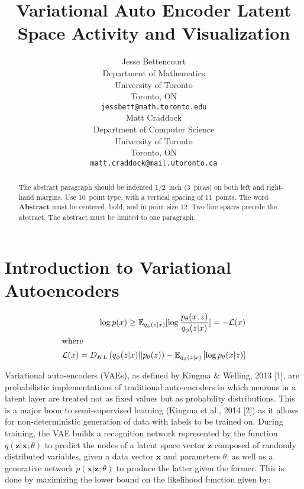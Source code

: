 \documentclass{article} %
\title{Variational Auto Encoder Latent Space Activity and Visualization}
\author{
Jesse Bettencourt\\
Department of Mathematics\\
University of Toronto\\
Toronto, ON \\
\texttt{jessbett@math.toronto.edu} \\
\And
Matt Craddock\\
Department of Computer Science\\
University of Toronto\\
Toronto, ON \\
\texttt{matt.craddock@mail.utoronto.ca} \\
}
\renewcommand{\L}{\mathcal{L}}
\begin{document}
\maketitle

\begin{abstract}
The abstract paragraph should be indented 1/2~inch (3~picas) on both left and
right-hand margins. Use 10~point type, with a vertical spacing of 11~points.
The word \textbf{Abstract} must be centered, bold, and in point size 12. Two
line spaces precede the abstract. The abstract must be limited to one
paragraph.
\end{abstract}

\section{Introduction to Variational Autoencoders}



\begin{align}
\log p(x)\geq \mathbb{E}_{q_\phi(z|x)}[\log\frac{p_\theta(x,z)}{q_\phi(z|x)}]=-\L(x)\\
\intertext{where}
  \L(x)=D_{KL}\left(q_\phi(z|x)||p_\theta(z)\right)-\mathbb{E}_{q_\phi(z|x)}\left[\log{p_\theta(x|z)}\right]
  \label{eq:VAEOBJECTIVE}
\end{align}



Variational auto-encoders (VAEs), as defined by Kingma \& Welling, 2013 [1], are probabilistic implementations of traditional auto-encoders in which neurons in a latent layer are treated not as fixed values but as probability distributions. This is a major boon to semi-supervised learning (Kingma et al., 2014 [2]) as it allows for non-deterministic generation of data with labels to be trained on. During training, the VAE builds a recognition network represented by the function $q(\textbf{z}|\textbf{x};\theta)$ to predict the nodes of a latent space vector $\textbf{z}$ composed of randomly distributed variables, given a data vector $\textbf{x}$ and parameters $\theta$, as well as a generative network $p(\textbf{x}|\textbf{z};\theta)$ to produce the latter given the former. This is done by maximizing the lower bound on the likelihood function given by:
\end{document}
